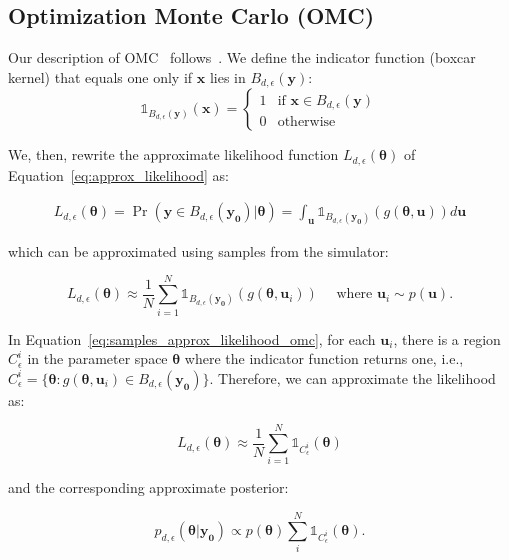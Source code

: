 \documentclass[article]{jss}
\newcommand{\ub}{\mathbf{u}}
\newcommand{\yb}{\mathbf{y}}
\newcommand{\xb}{\mathbf{x}}
\newcommand{\thetab}{\boldsymbol{\theta}}
\newcommand{\simulator}{g}
\newcommand{\region}{B_{d,\epsilon}}
\newcommand{\indicator}[1]{\mathbb{1}_{#1}}
\newcommand{\data}{\mathbf{y_0}}
\newcommand{\accregioni}{C^i_{\epsilon}}
\begin{document}
\subsection{Optimization Monte Carlo (OMC)}

Our description of OMC~\citet{Meeds2015}
follows~\citet{Ikonomov2019}. We define the indicator function (boxcar
kernel) that equals one only if \(\xb\) lies in \(\region(\yb)\):
%
\begin{equation}
  \label{eq:indicator}
  \indicator{\region(\yb)}(\xb)=
  \left\{
    \begin{array}{ll}
      1 & \mbox{if } \xb \in \region(\yb) \\
      0 & \mbox{otherwise}
    \end{array} \right. \end{equation}
%

We, then, rewrite the approximate likelihood function
\(L_{d, \epsilon}(\thetab)\) of Equation~\ref{eq:approx_likelihood} as:

\begin{gather}
  \label{eq:approx_likelihood_omc}
  L_{d, \epsilon}(\thetab) = \Pr(\yb \in \region(\data) | \thetab) =
  \int_{\ub} \indicator{\region(\data)}(g(\thetab, \ub)) d \ub
\end{gather}

which can be approximated using samples from the simulator:

\begin{equation}
  \label{eq:samples_approx_likelihood_omc}
  L_{d, \epsilon}(\thetab) \approx \frac{1}{N} \sum_{i=1}^N \indicator{\region (\data)} (\simulator(\thetab, \ub_i))
 \quad \text{ where } \ub_i \sim p(\ub).
\end{equation}

In Equation~\ref{eq:samples_approx_likelihood_omc}, for each
\(\ub_i\), there is a region \(\accregioni\) in the parameter space
\(\thetab\) where the indicator function returns one, i.e.,
\(\accregioni = \{ \thetab: \simulator(\thetab, \ub_i) \in
\region(\data) \}\). Therefore, we can approximate the likelihood as:

\begin{equation}
  \label{eq:alt_view_theta}
  L_{d, \epsilon}(\thetab) \approx \frac{1}{N} \sum_{i=1}^N \indicator{\accregioni}(\thetab)
\end{equation}

and the corresponding approximate posterior:

\begin{equation}
  \label{eq:approx_posterior_omc}
  p_{d,\epsilon}(\thetab|\data) \propto
  p(\thetab) \sum_i^N  \indicator{\accregioni}(\thetab).
\end{equation}
\end{document}
